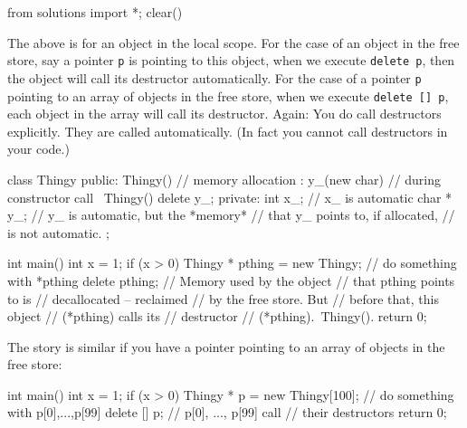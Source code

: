 \begin{python0}
from solutions import *; clear()
\end{python0}

The above is for an object in the local scope. For the case of an object
in the free store, say a pointer \texttt{p} is pointing to this object,
when we execute \texttt{delete p}, then the object will call its
destructor automatically. For the case of a pointer \texttt{p} pointing to
an array of objects in the free store, when we execute \texttt{delete
[] p}, each object in the array will call its destructor. Again: You
do  call destructors explicitly. They are called
automatically. (In fact you cannot call destructors in your code.)

\begin{consolethree}[escapeinside=||]
class Thingy
{
public:
    Thingy()             // memory allocation
        : y_(new char)   // during constructor call
    {}
    ~Thingy()
    {
        delete y_;
    }
private:
    int x_;     // x_ is automatic
    char * y_;  // y_ is automatic, but the *memory*
                // that y_ points to, if allocated,
                // is not automatic.
};

int main()
{
    int x = 1;
    if (x > 0)
    {
        Thingy * pthing = new Thingy;
        // do something with *pthing
        delete pthing; // Memory used by the object
                       // that pthing points to is
                       // decallocated -- reclaimed
                       // by the free store. But
                       // before that, this object
                       // (*pthing) calls its
                       // destructor
                       // (*pthing).~Thingy().
    }
    return 0;
}
\end{consolethree}

The story is similar if you have a pointer pointing to an array of
objects in the free store:

\begin{consolethree}[escapeinside=||]
int main()
{
    int x = 1;
    if (x > 0)
    {
        Thingy * p = new Thingy[100];
        // do something with p[0],...,p[99]
        delete [] p; // p[0], ..., p[99] call
                     // their destructors
    }
    return 0;
}
\end{consolethree}


